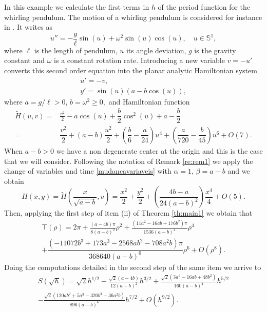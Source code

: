\documentclass[12pt,a4paper,reqno]{amsart}
\begin{document}
    In this example we calculate the first terms  in $h$ of the period function for the whirling pendulum.
      The motion of a whirling pendulum is considered for instance in
      \cite{Lic1999}. It writes as
\begin{equation*}
u''= -\dfrac{g}{\ell} \sin(u) +\omega^2 \sin(u) \cos(u), \quad u \in
\mathbb{S}^1,
\end{equation*}
where $\ell$ is the length of pendulum,  $u$ its angle deviation,
$g$ is the gravity constant and $\omega$ is a constant rotation
rate. Introducing a new variable $v=-u'$ converts this second order
equation  into  the planar analytic Hamiltonian system
\begin{equation}\label{eq:wp}
\begin{array}{l}
u'=-v, \\
y'= \sin(u) \left(a - b \cos(u) \right),
\end{array}
\end{equation}
where $a={g}/{\ell}>0$, $b=\omega^2 \geq 0,$ and Hamiltonian
function
\begin{align*}
\widetilde{H}(u,v)=& \frac{v^2}{2}- a \cos(u) + \dfrac{b}{2}
\cos^2(u) + a-\dfrac{b}{2}\nonumber\\
=& \dfrac{v^2}{2} + (a-b)\dfrac{u^2}{2} + \left(\dfrac{b}{6} -
\dfrac{a}{24}\right) u^4 + \left(\dfrac{a}{720} -
\dfrac{b}{45}\right) u^6 +  O(7).
\end{align*}
When $a-b>0$ we have a non degenerate center at the origin and this
is the case that we will consider. Following the notation of Remark
\ref{re:rem1} we apply the change of variables and time
\eqref{mudancavariaveis} with $\alpha=1$, $\beta=a-b$ and we obtain
\begin{equation*}
H(x,y)= \widetilde{H} \left( \frac{x}{\sqrt{a-b}},v
\right)=\dfrac{x^2}{2} + \dfrac{y^2}{2} + \left(
\dfrac{4b-a}{24(a-b)^2} \right) \dfrac{x^4}{4} + O(5).
\end{equation*}
Then, applying the first step of item (ii) of Theorem \ref{th:main1}
we obtain that
\begin{multline*}
\top(\rho) =2 \pi+ \frac{(a-4b)\pi}{8(a-b)^2}\rho^2+ \frac{(11a^2-16ab+176b^2)\pi}{1536(a-b)^4}\rho^4\\
+ \dfrac{(-11072b^3+173 a^3-2568 a b^2-708 a^2b)
\pi}{368640(a-b)^6}\rho^6 + O(\rho^8).
\end{multline*}
Doing the computations detailed in the second step of the same item
we arrive to
\begin{multline*}
S(\sqrt{h})=\sqrt{2}h^{1/2}-\frac{\sqrt{2}(a-4b)}{12(a-b)^2} h^{3/2} +\frac{\sqrt{2}(3a^2 - 16 ab +48b^2)}{160(a-b)^4}h^{5/2}\\
-\frac{\sqrt{2}(120ab^2 + 5a^3 - 320b^3 - 36
a^2b)}{896(a-b)^6}h^{7/2}+O(h^{9/2}).
\end{multline*}
\end{document}
